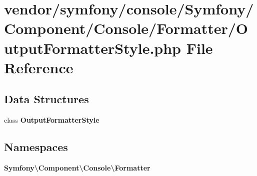 \section{vendor/symfony/console/\+Symfony/\+Component/\+Console/\+Formatter/\+Output\+Formatter\+Style.php File Reference}
\label{_output_formatter_style_8php}
\subsection*{Data Structures}
\begin{DoxyCompactItemize}
\item 
class {\bf Output\+Formatter\+Style}
\end{DoxyCompactItemize}
\subsection*{Namespaces}
\begin{DoxyCompactItemize}
\item 
 {\bf Symfony\textbackslash{}\+Component\textbackslash{}\+Console\textbackslash{}\+Formatter}
\end{DoxyCompactItemize}
